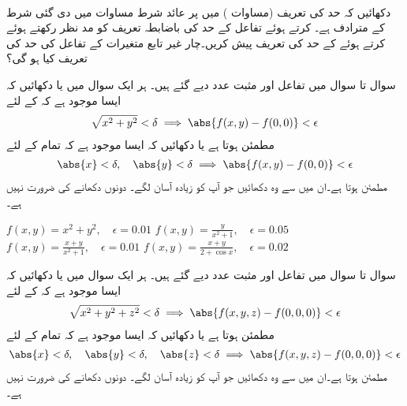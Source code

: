 \\
دکھائیں کہ حد کی تعریف  (مساوات ) میں  پر عائد  شرط مساوات  میں دی گئی شرط کے مترادف ہے۔
 کرتے ہوئے تفاعل کے حد  کی باضابطہ  تعریف کو مد نظر رکھتے ہوئے   کرتے ہوئے  کے حد کی تعریف پیش کریں۔چار غیر تابع متغیرات کے تفاعل  کی حد کی تعریف کیا ہو گی؟  

سوال  تا سوال  میں  تفاعل  اور مثبت عدد  دیے گئے ہیں۔ ہر ایک سوال میں یا دکھائیں کہ  ایسا  موجود ہے  کہ   کے لئے 
\begin{align*}
\sqrt{x^2+y^2}<\delta\implies \abs{f(x,y)-f(0,0)}<\epsilon
\end{align*}
مطمئن ہوتا ہے  یا دکھائیں کہ ایسا  موجود ہے کہ تمام  کے لئے
\begin{align*}
\abs{x}<\delta,\quad \abs{y}<\delta \implies \abs{f(x,y)-f(0,0)}<\epsilon
\end{align*}
مطمئن ہوتا ہے۔ان میں سے وہ دکھائیں  جو آپ کو زیادہ  آسان لگے۔ دونوں دکھانے  کی ضرورت نہیں ہے۔ 

$f(x,y)=x^2+y^2,\quad \epsilon=0.01$
$f(x,y)=\frac{y}{x^2+1},\quad \epsilon=0.05$
$f(x,y)=\frac{x+y}{x^2+1},\quad \epsilon=0.01$
$f(x,y)=\frac{x+y}{2+\cos x},\quad \epsilon=0.02$


سوال  تا سوال  میں  تفاعل  اور مثبت عدد  دیے گئے ہیں۔ ہر ایک سوال میں یا دکھائیں کہ  ایسا  موجود ہے  کہ   کے لئے 
\begin{align*}
\sqrt{x^2+y^2+z^2}<\delta\implies \abs{f(x,y,z)-f(0,0,0)}<\epsilon
\end{align*}
مطمئن ہوتا ہے  یا دکھائیں کہ ایسا  موجود ہے کہ تمام  کے لئے
\begin{align*}
\abs{x}<\delta,\quad \abs{y}<\delta,\quad \abs{z}<\delta  \implies \abs{f(x,y,z)-f(0,0,0)}<\epsilon
\end{align*}
مطمئن ہوتا ہے۔ان میں سے وہ دکھائیں  جو آپ کو زیادہ  آسان لگے۔ دونوں دکھانے کی ضرورت نہیں ہے۔ 

